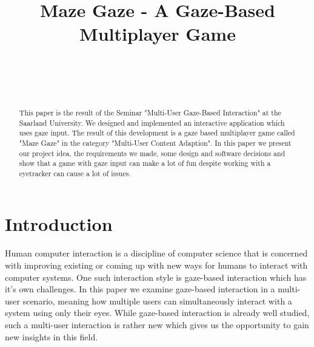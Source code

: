 \documentclass{sigchi}
\def\plaintitle{Maze Gaze - A Gaze-Based Multiplayer Game}
\def\plainkeywords{eye-tracking; gaze-based interaction; multi-user interaction; human computer interaction;}
\begin{document}
\title{\plaintitle}

\author{%
  \\
  \\
  \\
}

\maketitle

\begin{abstract}
This paper is the result of the Seminar "Multi-User Gaze-Based Interaction" at the Saarland University. We designed and implemented an interactive application which uses gaze input. The result of this development is a gaze based multiplayer game called "Maze Gaze" in the category "Multi-User Content Adaption". In this paper we present our project idea, the requirements we made, some design and software decisions and show that a game with gaze input can make a lot of fun despite working with a eyetracker can cause a lot of issues.
\end{abstract}


\section{Introduction}
Human computer interaction is a discipline of computer science that is concerned with improving existing or coming up with new ways for humans to interact with computer systems. One such interaction style is gaze-based interaction which has it's own challenges. In this paper we examine gaze-based interaction in a multi-user scenario, meaning how multiple users can simultaneously interact with a system using only their eyes. While gaze-based interaction is already well studied, such a multi-user interaction is rather new which gives us the opportunity to gain new insights in this field.
\end{document}

